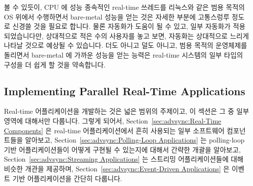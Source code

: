 볼 수 있듯이, CPU 에 성능 종속적인 real-time 쓰레드를 리눅스와 같은 범용 목적의
OS 위에서 수행하면서 bare-metal 성능을 얻는 것은 자세한 부분에 고통스렁루
정도로 신경쓸 것을 필요로 합니다.
물론 자동화가 도움이 될 수 있고, 일부 자동화가 적용되었습니다만, 상대적으로
적은 수의 사용자를 놓고 보면, 자동화는 상대적으로 느리게 나타날 것으로 예상될
수 있습니다.
더도 아니고 덜도 아니고, 범용 목적의 운영체제를 돌리면서 bare-metal 에 가까운
성능을 얻는 능력은 real-time 시스템의 일부 타입의 구성을 더 쉽게 할 것을
약속합니다.

\subsection{Implementing Parallel Real-Time Applications}
\label{sec:advsync:Implementing Parallel Real-Time Applications}

Real-time 어플리케이션을 개발하는 것은 넓은 범위의 주제이고, 이 섹션은 그 중 일부 영역에 대해서만 다룹니다.
그렇게 되어서,
Section~\ref{sec:advsync:Real-Time Components}
은 real-time 어플리케이션에서 흔히 사용되는 일부 소프트웨어 컴포넌트들을 알아보고,
Section~\ref{sec:advsync:Polling-Loop Applications}
는 polling-loop 기반 어플리케이션들이 어떻게 구현될 수 있는지에 대해서 간략한 개괄을 알아보고,
Section~\ref{sec:advsync:Streaming Applications}
는 스트리밍 어플리케이션들에 대해 비슷한 개관을 제공하며,
Section~\ref{sec:advsync:Event-Driven Applications}
은 이벤트 기반 어플리케이션을 간단히 다룹니다.
\iffalse

